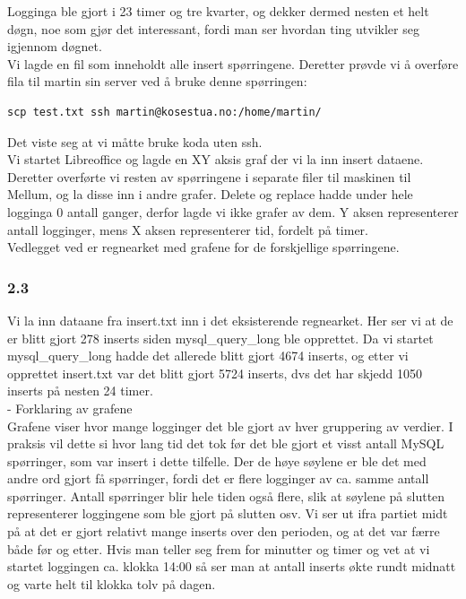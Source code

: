 \documentclass[a4paper, norsk, 12pt]{article}
\begin{document}
Logginga ble gjort i 23 timer og tre kvarter, og dekker dermed nesten et helt døgn, noe som gjør det interessant, fordi man ser hvordan ting utvikler seg igjennom døgnet.\\

Vi lagde en fil som inneholdt alle insert spørringene. Deretter prøvde vi å overføre fila til martin sin server ved å bruke denne spørringen:
\begin{verbatim}
scp test.txt ssh martin@kosestua.no:/home/martin/
\end{verbatim}
Det viste seg at vi måtte bruke koda uten ssh.\\

Vi startet Libreoffice og lagde en XY aksis graf der vi la inn insert dataene. Deretter overførte vi resten av spørringene i separate filer til maskinen til Mellum, og la disse inn i andre grafer. Delete og replace hadde under hele logginga 0 antall ganger, derfor lagde vi ikke grafer av dem. Y aksen representerer antall logginger, mens X aksen representerer tid, fordelt på timer. \\

Vedlegget ved er regnearket med grafene for de forskjellige spørringene.

\subsubsection*{2.3}
Vi la inn dataane fra insert.txt inn i det eksisterende regnearket. Her ser vi at de er blitt gjort 278 inserts siden mysql\_query\_long ble opprettet. Da vi startet mysql\_query\_long hadde det allerede blitt gjort 4674 inserts, og etter vi opprettet insert.txt var det blitt gjort 5724 inserts, dvs det har skjedd 1050 inserts på nesten 24 timer. \\

- Forklaring av grafene\\
Grafene viser hvor mange logginger det ble gjort av hver gruppering av verdier. I praksis vil dette si hvor lang tid det tok før det ble gjort et visst antall MySQL spørringer, som var insert i dette tilfelle. Der de høye søylene er ble det med andre ord gjort få spørringer, fordi det er flere logginger av ca. samme antall spørringer. Antall spørringer blir hele tiden også flere, slik at søylene på slutten representerer loggingene som ble gjort på slutten osv. Vi ser ut ifra partiet midt på at det er gjort relativt mange inserts over den perioden, og at det var færre både før og etter. Hvis man teller seg frem for minutter og timer og vet at vi startet loggingen ca. klokka 14:00 så ser man at antall inserts økte rundt midnatt og varte helt til klokka tolv på dagen.
\end{document}
